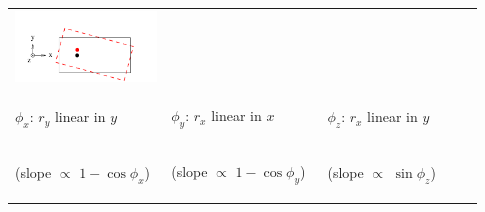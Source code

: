 \documentclass[compress]{beamer}
\begin{document}
\begin{frame}
\begin{center}
\begin{tabular}{p{0.31\linewidth} p{0.31\linewidth} p{0.31\linewidth}}
  \begin{minipage}{\linewidth}
    \tiny
    \includegraphics[width=\linewidth]{dof_phiz.pdf}
  \end{minipage} \\
  \begin{minipage}{\linewidth}
    \begin{center}
      $\phi_x$: $r_y$ linear in $y$
    \end{center}
  \end{minipage} &
  \begin{minipage}{\linewidth}
    \begin{center}
      $\phi_y$: $r_x$ linear in $x$
    \end{center}
  \end{minipage} &
  \begin{minipage}{\linewidth}
    \begin{center}
      $\phi_z$: $r_x$ linear in $y$
    \end{center}
  \end{minipage} \\
  \begin{minipage}{\linewidth}
    \scriptsize
    \begin{center}
      (slope $\propto$ $1 - \cos\phi_x$)
    \end{center}
  \end{minipage} &
  \begin{minipage}{\linewidth}
    \scriptsize
    \begin{center}
      (slope $\propto$ $1 - \cos\phi_y$)
    \end{center}
  \end{minipage} &
  \begin{minipage}{\linewidth}
    \scriptsize
    \begin{center}
      (slope $\propto$ $\sin\phi_z$)
    \end{center}
  \end{minipage}
\end{tabular}
\end{center}


\end{frame}
\end{document}
